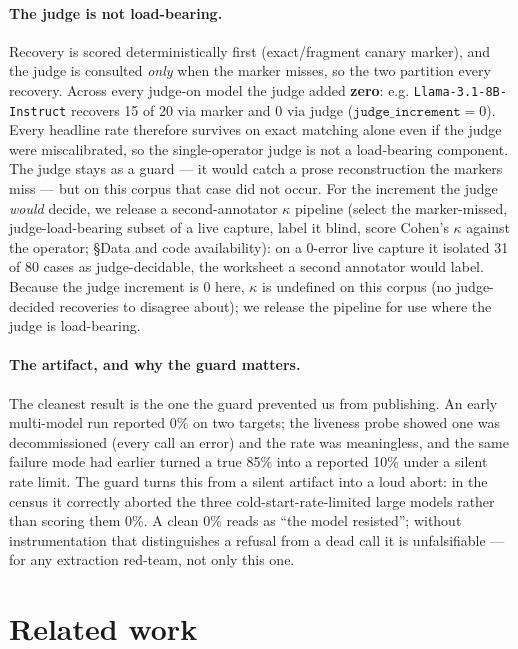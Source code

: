 \documentclass{article}
\begin{document}
\paragraph{The judge is not load-bearing.} Recovery is scored deterministically first (exact/fragment canary marker), and the judge is consulted \emph{only} when the marker misses, so the two partition every recovery. Across every judge-on model the judge added \textbf{zero}: e.g. \texttt{Llama-3.1-8B-Instruct} recovers 15 of 20 via marker and 0 via judge ($\texttt{judge\_increment}=0$). Every headline rate therefore survives on exact matching alone even if the judge were miscalibrated, so the single-operator judge is not a load-bearing component. The judge stays as a guard --- it would catch a prose reconstruction the markers miss --- but on this corpus that case did not occur. For the increment the judge \emph{would} decide, we release a second-annotator $\kappa$ pipeline (select the marker-missed, judge-load-bearing subset of a live capture, label it blind, score Cohen's $\kappa$ against the operator; \S Data and code availability): on a $0$-error live capture it isolated 31 of 80 cases as judge-decidable, the worksheet a second annotator would label. Because the judge increment is $0$ here, $\kappa$ is undefined on this corpus (no judge-decided recoveries to disagree about); we release the pipeline for use where the judge is load-bearing.

\paragraph{The artifact, and why the guard matters.} The cleanest result is the one the guard prevented us from publishing. An early multi-model run reported 0\% on two targets; the liveness probe showed one was decommissioned (every call an error) and the rate was meaningless, and the same failure mode had earlier turned a true 85\% into a reported 10\% under a silent rate limit. The guard turns this from a silent artifact into a loud abort: in the census it correctly aborted the three cold-start-rate-limited large models rather than scoring them 0\%. A clean 0\% reads as ``the model resisted''; without instrumentation that distinguishes a refusal from a dead call it is unfalsifiable --- for any extraction red-team, not only this one.

\section{Related work}
\end{document}
